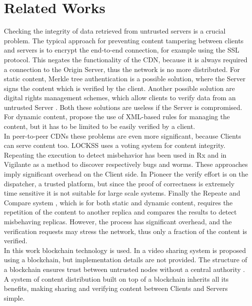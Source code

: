 \documentclass[conference,compsoc]{IEEEtran}
\begin{document}
\section{Related Works}
Checking the integrity of data retrieved from untrusted servers is a crucial problem. The typical approach for preventing content tampering between clients and servers is to encrypt the end-to-end connection, for example using the SSL protocol.
This negates the functionality of the CDN, because it is always required a connection to the Origin Server, thus the network is no more distributed. For static content, Merkle tree authentication \cite{bayardo2005merkle} is a possible solution, where the Server signs the content which is verified by the client. Another possible solution are digital rights management schemes, which allow clients to verify data from an untrusted Server \cite{adelsbach2005towards}. Both these solutions are useless if the Server is compromised. 
For dynamic content, \cite{chi2002xml}\cite{orman2001data} propose the use of XML-based rules for managing the content, but it has to be limited to be easily verified by a client.\\
In peer-to-peer CDNs these problems are even more significant, because Clients can serve content too. LOCKSS\cite{maniatis2003preserving} uses a voting system for content integrity. 
Repeating the execution to detect misbehavior has been used in Rx\cite{qin2005rx} and in Vigilante \cite{costa2005vigilante} as a method to discover respectively bugs and worms. These approaches imply significant overhead on the Client side. In Pioneer\cite{seshadri2005pioneer} the verify effort is on the dispatcher, a trusted platform, but since the proof of correctness is extremely time sensitive it is not suitable for large scale systems.
Finally the Repeate and Compare system \cite{michalakis2007ensuring}, which is for both static and dynamic content, requires the repetition of the content to another replica and compares the results to detect misbehaving replicas. However, the process has significant overhead, and the verification requests may stress the network, thus only a fraction of the content is verified.\\
In this work blockchain technology is used. In \cite{kishigami2015blockchain} a video sharing system is proposed using a blockchain, but implementation details are not provided. The structure of a blockchain ensures trust between untrusted nodes without a central authority \cite{nakamoto2008bitcoin}. A system of content distribution built on top of a blockchain inherits all its benefits, making sharing and verifying content between Clients and Servers simple. 
\end{document}
